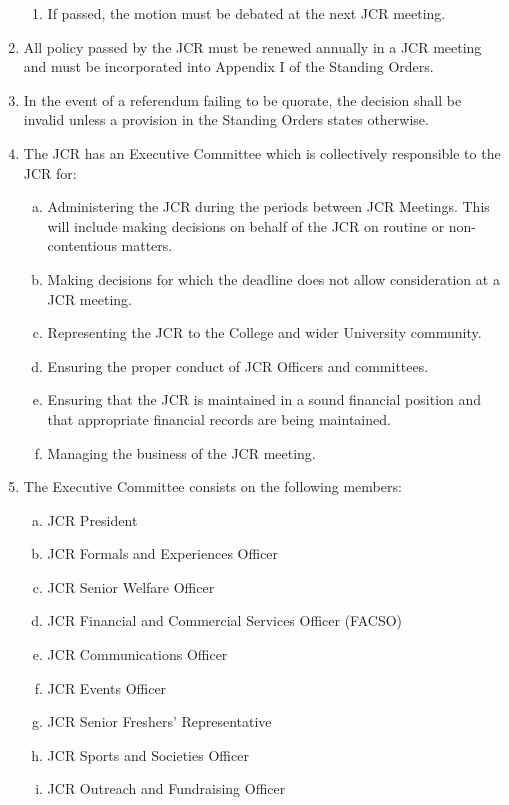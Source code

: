 \documentclass[12pt]{article}  %
\begin{document}
\begin{enumerate}
    \begin{enumerate}
        \item If passed, the motion must be debated at the next JCR meeting.
    \end{enumerate}
    \item All policy passed by the JCR must be renewed annually in a JCR meeting and must be incorporated into Appendix I of the Standing Orders.
    \item In the event of a referendum failing to be quorate, the decision shall be invalid unless a provision in the Standing Orders states otherwise.
    \item The JCR has an Executive Committee which is collectively responsible to the JCR for:
    \begin{enumerate}[(a)]
        \item Administering the JCR during the periods between JCR Meetings. This will include making decisions on behalf of the JCR on routine or non-contentious matters.
        \item Making decisions for which the deadline does not allow consideration at a JCR meeting.
        \item Representing the JCR to the College and wider University community.
        \item Ensuring the proper conduct of JCR Officers and committees.
        \item Ensuring that the JCR is maintained in a sound financial position and that appropriate financial records are being maintained.
        \item Managing the business of the JCR meeting.
    \end{enumerate}
    \item The Executive Committee consists on the following members:
    \begin{enumerate}[(a)]
        \item JCR President
        \item JCR Formals and Experiences Officer
        \item JCR Senior Welfare Officer
        \item JCR Financial and Commercial Services Officer (FACSO)
        \item JCR Communications Officer
        \item JCR Events Officer
        \item JCR Senior Freshers’ Representative
        \item JCR Sports and Societies Officer
        \item JCR Outreach and Fundraising Officer

\end{enumerate}
\end{enumerate}
\end{document}
